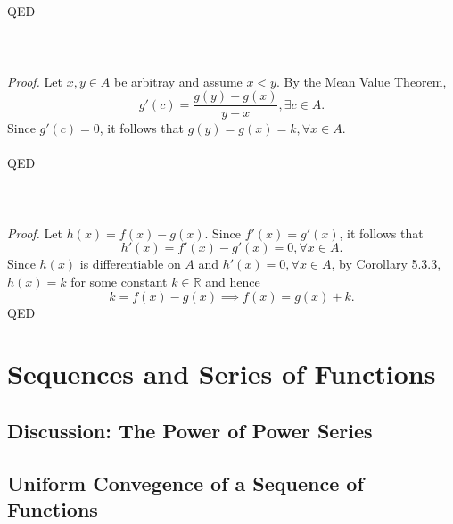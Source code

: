 \documentclass{article}
\begin{document}
        \\ \\
        QED
        \\ \\
            \\ \\
            \textit{Proof.} Let $x,y \in A$ be arbitray and assume $x<y$. By the Mean Value Theorem,
            \begin{equation*}
                g'(c) = \frac{g(y)-g(x)}{y-x}, \exists c \in A.
            \end{equation*}
            Since $g'(c)=0$, it follows that $g(y)=g(x)=k, \forall x \in A$.
            \\ \\
            QED
            \\ \\
            \\ \\
            \textit{Proof.} Let $h(x) = f(x) - g(x)$. Since $f'(x)=g'(x)$, it follows that
            \begin{equation*}
                h'(x) = f'(x) - g'(x) = 0, \forall x \in A.
            \end{equation*}
            Since $h(x)$ is differentiable on $A$ and $h'(x)=0, \forall x \in A$, by Corollary 5.3.3, $h(x)=k$ for some constant $k \in \mathbb{R}$ and hence
            \begin{equation*}
                k = f(x) - g(x) \implies f(x) = g(x) + k.
            \end{equation*}
            QED
            
            \section{Sequences and Series of Functions}
            \subsection{Discussion: The Power of Power Series}
            \subsection{Uniform Convegence of a Sequence of Functions}
\end{document}

